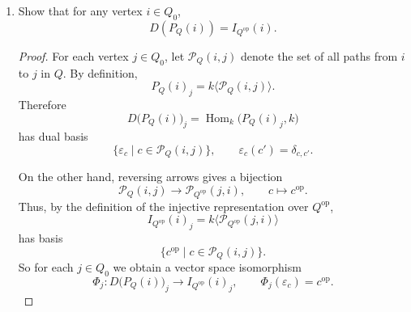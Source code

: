 \documentclass[11pt, a4paper]{article}
\begin{document}
\begin{enumerate}[leftmargin=*, label=\textbf{\arabic*.}]
\begin{proof}
    Suppose for contradiction that $I(j)$ is not simple, so there exists a nonzero proper subrepresentation $N\subsetneq I(j)$.
    
    Since $Q$ is acyclic, the path algebra $kQ$ is hereditary, and thus $\operatorname{Rep}Q$ is a hereditary category. In a hereditary category, subrepresentations of injective representations are injective. Therefore $N$ is injective.
    
    By the Krull--Schmidt theorem, $N\cong\bigoplus_{i\in Q_0}I(i)^{m_i}$ for some non-negative integers $m_i$, not all zero. The inclusion $N\hookrightarrow I(j)$ restricts to a nonzero morphism $I(i)\to I(j)$ for each $i$ with $m_i>0$.
    
    If $i\neq j$: by hypothesis, $\operatorname{Hom}(I(i),I(j))=0$, so no such nonzero morphism exists. Hence $m_i=0$ for all $i\neq j$.
    
    If $i=j$: then $N\cong I(j)^m$ for some $m\geq 1$. Since $N$ is a subrepresentation of $I(j)$ and $I(j)$ is indecomposable, comparing dimensions gives
    \[
    \dim N_\ell = m\cdot\dim I(j)_\ell \leq \dim I(j)_\ell
    \]
    for every vertex $\ell$. Since $I(j)_j\cong k\neq 0$, this forces $m\leq 1$, so $m=1$ and $N\cong I(j)$, hence $N=I(j)$. This contradicts $N\subsetneq I(j)$.
    
    Therefore no such $N$ exists, and $I(j)$ is simple.
\end{proof}

\item Show that for any vertex $i\in Q_0$,
\[
D(P_Q(i)) = I_{Q^{\operatorname{op}}}(i).
\]

\begin{proof}
    For each vertex $j\in Q_0$, let $\mathcal P_Q(i,j)$ denote the set of all paths from
    $i$ to $j$ in $Q$. By definition,
    \[
    P_Q(i)_j = k\langle \mathcal P_Q(i,j)\rangle .
    \]
    Therefore
    \[
    D\bigl(P_Q(i)\bigr)_j=\operatorname{Hom}_k\bigl(P_Q(i)_j,k\bigr)
    \]
    has dual basis
    \[
    \{\varepsilon_c \mid c\in \mathcal P_Q(i,j)\},
    \qquad
    \varepsilon_c(c')=\delta_{c,c'}.
    \]
    
    On the other hand, reversing arrows gives a bijection
    \[
    \mathcal P_Q(i,j)\longrightarrow \mathcal P_{Q^{\operatorname{op}}}(j,i),
    \qquad
    c\longmapsto c^{\operatorname{op}}.
    \]
    Thus, by the definition of the injective representation over $Q^{\operatorname{op}}$,
    \[
    I_{Q^{\operatorname{op}}}(i)_j
    =
    k\langle \mathcal P_{Q^{\operatorname{op}}}(j,i)\rangle
    \]
    has basis
    \[
    \{c^{\operatorname{op}}\mid c\in\mathcal P_Q(i,j)\}.
    \]
    So for each $j\in Q_0$ we obtain a vector space isomorphism
    \[
    \Phi_j\colon D\bigl(P_Q(i)\bigr)_j \longrightarrow I_{Q^{\operatorname{op}}}(i)_j,
    \qquad
    \Phi_j(\varepsilon_c)=c^{\operatorname{op}}.
    \]
    

\end{proof}
\end{enumerate}
\end{document}
